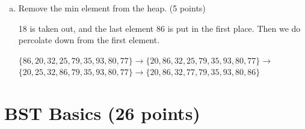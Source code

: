 \documentclass[11pt]{exam}
\begin{document}
\begin{enumerate}[a)]
\item Remove the min element from the heap. (5 points)
\begin{solution}
    18 is taken out, and the last element 86 is put in the first place. Then we do 
    percolate down from the first element. \par 
    $\{86,20,32,25,79,35,93,80,77\} \rightarrow 
    \{20,86,32,25,79,35,93,80,77\} \rightarrow$ \\
    $\{20,25,32,86,79,35,93,80,77\} \rightarrow
    \{20,86,32,77,79,35,93,80,86\}$
\end{solution}

\end{enumerate}

\section{BST Basics (26 points)}
\end{document}

